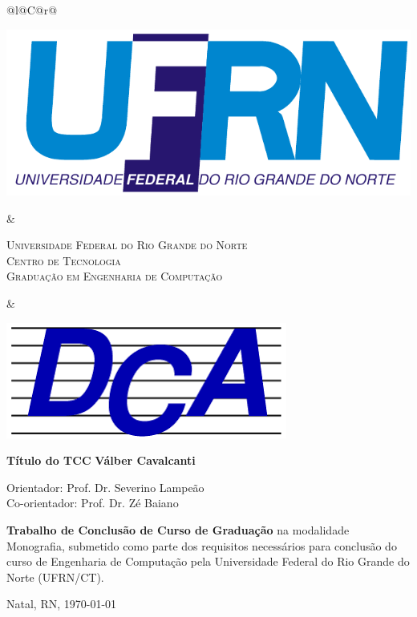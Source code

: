 %
%

\begin{titlepage}

\begin{center}

\small

\begin{tabularx}{\linewidth}{@{}l@{}C@{}r@{}}
\parbox[c]{3cm}{\includegraphics[width=\linewidth]{./figuras/UFRN}} &
\begin{center}
\textsf{\textsc{Universidade Federal do Rio Grande do Norte\\
Centro de Tecnologia\\
Graduação em Engenharia de Computação}}
\end{center} &
\parbox[c]{3cm}{\includegraphics[width=\linewidth]{./figuras/dca_logo.png}}
\end{tabularx}

\vfill
\LARGE
\textbf{Título do TCC}
\vfill
\Large
\textbf{Válber Cavalcanti}
\vfill

\normalsize

Orientador: Prof. Dr. Severino Lampeão
\\[2ex] Co-orientador: Prof. Dr. Zé Baiano %

\vfill

\hfill
\parbox{0.5\linewidth}{\textbf{%
Trabalho de Conclusão de Curso de Graduação} na modalidade Monografia, 
submetido como parte dos requisitos necessários para 
conclusão do curso de Engenharia de Computação pela 
Universidade Federal do Rio Grande do Norte (UFRN/CT).
}

\vfill

\large

Natal, RN, \today

\end{center}

\end{titlepage}
